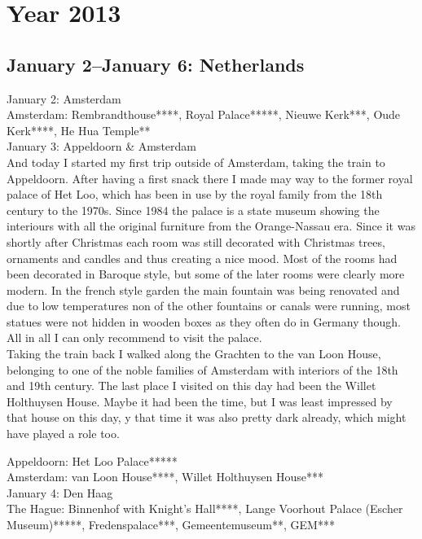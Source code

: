 \chapter{Year 2013}
\label{2013}

\section{January 2--January 6: Netherlands}
\label{2013:Netherlands}

January 2: Amsterdam\\
Amsterdam: Rembrandthouse****, Royal Palace*****, Nieuwe Kerk***, Oude Kerk****, He Hua Temple**\\

January 3: Appeldoorn \& Amsterdam\\
And today I started my first trip outside of Amsterdam, taking the train to Appeldoorn. After having a first snack there I made may way to the former royal palace of Het Loo, which has been in use by the royal family from the 18th century to the 1970s. Since 1984 the palace is a state museum showing the interiours with all the original furniture from the Orange-Nassau era. Since it was shortly after Christmas each room was still decorated with Christmas trees, ornaments and candles and thus creating a nice mood. Most of the rooms had been decorated in Baroque style, but some of the later rooms were clearly more modern. In the french style garden the main fountain was being renovated and due to low temperatures non of the other fountains or canals were running, most statues were not hidden in wooden boxes as they often do in Germany though. All in all I can only recommend to visit the palace. \\
Taking the train back I walked along the Grachten to the van Loon House, belonging to one of the noble families of Amsterdam with interiors of the 18th and 19th century. The last place I visited on this day had been the Willet Holthuysen House. Maybe it had been the time, but I was least impressed by that house on this day, y that time it was also pretty dark already, which might have played a role too.\

Appeldoorn: Het Loo Palace*****\\
Amsterdam: van Loon House****, Willet Holthuysen House***\\

January 4: Den Haag\\
The Hague: Binnenhof with Knight's Hall****, Lange Voorhout Palace (Escher Museum)*****, Fredenspalace***, Gemeentemuseum**, GEM***\\

